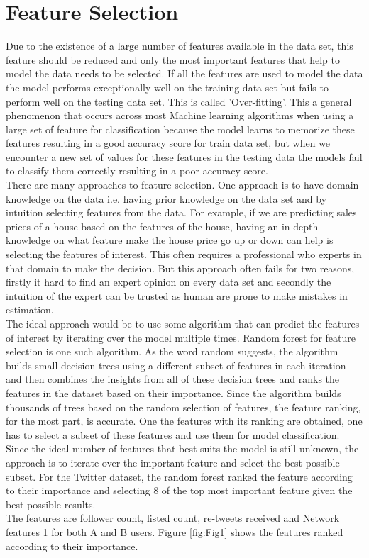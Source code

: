 \documentclass[sigconf]{acmart}
\begin{document}
\section{Feature Selection}

Due to the existence of a large number of features available in the data set, this feature should be reduced and only the most important features that help to model the data needs to be selected. If all the features are used to model the data the model performs exceptionally well on the training data set but fails to perform well on the testing data set. This is called 'Over-fitting'. This a general phenomenon that occurs across most Machine learning algorithms when using a large set of feature for classification because the model learns to memorize these features resulting in a good accuracy score for train data set, but when we encounter a new set of values for these features in the testing data the models fail to classify them correctly resulting in a poor accuracy score.\\
There are many approaches to feature selection. One approach is to have domain knowledge on the data i.e. having prior knowledge on the data set and by intuition selecting features from the data. For example, if we are predicting sales prices of a house based on the features of the house, having an in-depth knowledge on what feature make the house price go up or down can help is selecting the features of interest. This often requires a professional who experts in that domain to make the decision. But this approach often fails for two reasons, firstly it hard to find an expert opinion on every data set and secondly the intuition of the expert can be trusted as human are prone to make mistakes in estimation.\\
The ideal approach would be to use some algorithm that can predict the features of interest by iterating over the model multiple times. Random forest for feature selection is one such algorithm. As the word random suggests, the algorithm builds small decision trees using a different subset of features in each iteration and then combines the insights from all of these decision trees and ranks the features in the dataset based on their importance. Since the algorithm builds thousands of trees based on the random selection of features, the feature ranking, for the most part, is accurate. One the features with its ranking are obtained, one has to select a subset of these features and use them for model classification. Since the ideal number of features that best suits the model is still unknown, the approach is to iterate over the important feature and select the best possible subset. For the Twitter dataset, the random forest ranked the feature according to their importance and selecting 8 of the top most important feature given the best possible results.\\
The features are follower count, listed count, re-tweets received and Network features 1 for both A and B users. Figure \ref{fig:Fig1} shows the features ranked according to their importance. \\
\end{document}
